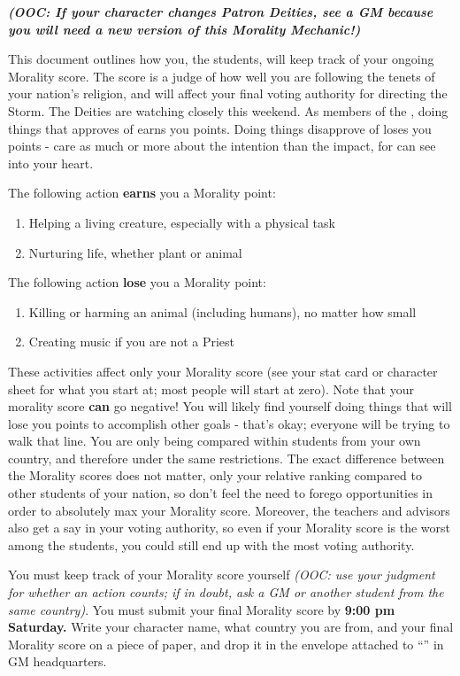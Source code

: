 \documentclass[green]{GL2020}
\begin{document}
\name{\gCoSStudentMorality{}}
\emph{\textbf{(OOC: If your character changes Patron Deities, see a GM because you will need a new version of this Morality Mechanic!)}}

This document outlines how you, the students, will keep track of your ongoing Morality score. The score is a judge of how well you are following the tenets of your nation’s religion, and will affect your final voting authority for directing the Storm. The Deities are watching closely this weekend. As members of the \pFarm{}, doing things that \cFarmGod{} approves of earns you points. Doing things \cFarmGod{\they} disapprove\cFarmGod{\plural} of loses you points - \cFarmGod{\they} care as much or more about the intention than the impact, for \cFarmGod{\they} can see into your heart.

The following action \textbf{earns} you a Morality point:
\begin{enumerate}
  \item Helping a living creature, especially with a physical task
  \item Nurturing life, whether plant or animal
\end{enumerate}

The following action \textbf{lose} you a Morality point:
\begin{enumerate}
  \item Killing or harming an animal (including humans), no matter how small
  \item Creating music if you are not a Priest
\end{enumerate}

These activities affect only your Morality score (see your stat card or character sheet for what you start at; most people will start at zero).  Note that your morality score \textbf{can} go negative! You will likely find yourself doing things that will lose you points to accomplish other goals - that’s okay; everyone will be trying to walk that line. You are only being compared within students from your own country, and therefore under the same restrictions. The exact difference between the Morality scores does not matter, only your relative ranking compared to other students of your nation, so don’t feel the need to forego opportunities in order to absolutely max your Morality score. Moreover, the teachers and advisors also get a say in your voting authority, so even if your Morality score is the worst among the students, you could still end up with the most voting authority. 

You must keep track of your Morality score yourself \emph{(OOC: use your judgment for whether an action counts; if in doubt, ask a GM or another student from the same country)}. You must submit your final Morality score by \textbf{9:00 pm Saturday.} Write your character name, what country you are from, and your final Morality score on a piece of paper, and drop it in the envelope attached to “\sSignV{}” in GM headquarters. 
\end{document}
